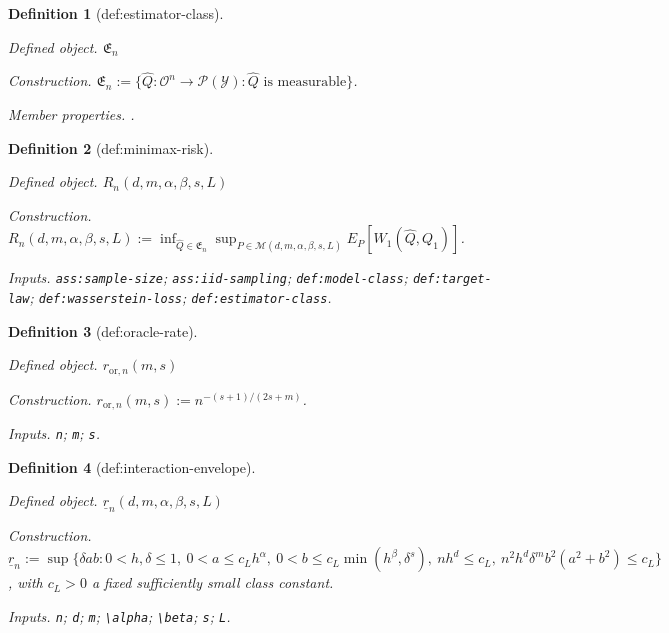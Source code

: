 \documentclass{article}
\newtheorem{definition}{Definition}
\begin{document}
\begin{definition}[def:estimator-class]\label{def:estimator-class}
\par\smallskip\noindent\emph{Defined object.} \(\mathfrak E_n\)
\par\smallskip\noindent\emph{Construction.} \(\mathfrak E_n:=\{\widehat Q:\mathcal O^n\to\mathcal P(\mathcal Y):\widehat Q\text{ is measurable}\}\).
\par\smallskip\noindent\emph{Member properties.} .
\end{definition}

\begin{definition}[def:minimax-risk]\label{def:minimax-risk}
\par\smallskip\noindent\emph{Defined object.} \(R_n(d,m,\alpha,\beta,s,L)\)
\par\smallskip\noindent\emph{Construction.} \(R_n(d,m,\alpha,\beta,s,L):=\inf_{\widehat Q\in\mathfrak E_n}\sup_{P\in\mathcal M(d,m,\alpha,\beta,s,L)}E_P[W_1(\widehat Q,Q_1)]\).
\par\smallskip\noindent\emph{Inputs.} \texttt{ass:\allowbreak{}sample-\allowbreak{}size}; \texttt{ass:\allowbreak{}iid-\allowbreak{}sampling}; \texttt{def:\allowbreak{}model-\allowbreak{}class}; \texttt{def:\allowbreak{}target-\allowbreak{}law}; \texttt{def:\allowbreak{}wasserstein-\allowbreak{}loss}; \texttt{def:\allowbreak{}estimator-\allowbreak{}class}.
\end{definition}

\begin{definition}[def:oracle-rate]\label{def:oracle-rate}
\par\smallskip\noindent\emph{Defined object.} \(r_{\mathrm{or},n}(m,s)\)
\par\smallskip\noindent\emph{Construction.} \(r_{\mathrm{or},n}(m,s):=n^{-(s+1)/(2s+m)}\).
\par\smallskip\noindent\emph{Inputs.} \texttt{n}; \texttt{m}; \texttt{s}.
\end{definition}

\begin{definition}[def:interaction-envelope]\label{def:interaction-envelope}
\par\smallskip\noindent\emph{Defined object.} \(\underline r_n(d,m,\alpha,\beta,s,L)\)
\par\smallskip\noindent\emph{Construction.} \(\underline r_n:=\sup\{\delta ab:0<h,\delta\le1,\ 0<a\le c_Lh^{\alpha},\ 0<b\le c_L\min(h^{\beta},\delta^s),\ nh^d\le c_L,\ n^2h^d\delta^m b^2(a^2+b^2)\le c_L\}\), with \(c_L>0\) a fixed sufficiently small class constant.
\par\smallskip\noindent\emph{Inputs.} \texttt{n}; \texttt{d}; \texttt{m}; \texttt{\textbackslash{}\allowbreak{}alpha}; \texttt{\textbackslash{}\allowbreak{}beta}; \texttt{s}; \texttt{L}.
\end{definition}
\end{document}
